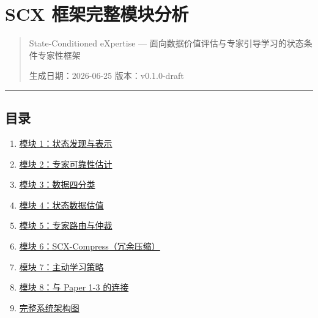 \documentclass[
  12pt,
]{ctexart}
\author{SCX}
\date{2026}
\providecommand{\tightlist}{%
  \setlength{\itemsep}{0pt}\setlength{\parskip}{0pt}}
\begin{document}
\section{SCX
框架完整模块分析}\label{scx-ux6846ux67b6ux5b8cux6574ux6a21ux5757ux5206ux6790}

\begin{quote}
State-Conditioned eXpertise ---
面向数据价值评估与专家引导学习的状态条件专家性框架

生成日期：2026-06-25 \textbar{} 版本：v0.1.0-draft
\end{quote}

\begin{center}\rule{0.5\linewidth}{0.5pt}\end{center}

\subsection{目录}\label{ux76eeux5f55}

\begin{enumerate}
\def\labelenumi{\arabic{enumi}.}
\tightlist
\item
  \hyperref[ux6a21ux5757-1ux72b6ux6001ux53d1ux73b0ux4e0eux8868ux793a-state-discovery--representation]{模块
  1：状态发现与表示}
\item
  \hyperref[ux6a21ux5757-2ux4e13ux5bb6ux53efux9760ux6027ux4f30ux8ba1-expert-reliability-estimation]{模块
  2：专家可靠性估计}
\item
  \hyperref[ux6a21ux5757-3ux6570ux636eux56dbux5206ux7c7b-data-four-classification]{模块
  3：数据四分类}
\item
  \hyperref[ux6a21ux5757-4ux72b6ux6001ux6570ux636eux4f30ux503c-state-data-valuation]{模块
  4：状态数据估值}
\item
  \hyperref[ux6a21ux5757-5ux4e13ux5bb6ux8defux7531ux4e0eux4ef2ux88c1-expert-routing--arbitration]{模块
  5：专家路由与仲裁}
\item
  \hyperref[ux6a21ux5757-6scx-compressux5197ux4f59ux538bux7f29]{模块
  6：SCX-Compress（冗余压缩）}
\item
  \hyperref[ux6a21ux5757-7ux4e3bux52a8ux5b66ux4e60ux7b56ux7565-active-learning-policy]{模块
  7：主动学习策略}
\item
  \hyperref[ux6a21ux5757-8ux4e0e-paper-1-3-ux7684ux8fdeux63a5]{模块
  8：与 Paper 1-3 的连接}
\item
  \hyperref[ux5b8cux6574ux7cfbux7edfux67b6ux6784ux56fe]{完整系统架构图}
\end{enumerate}
\end{document}
